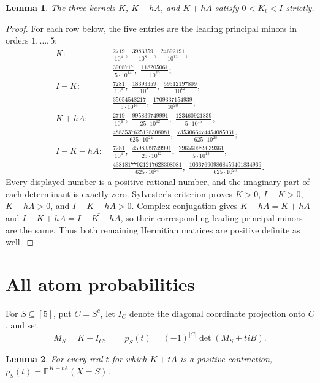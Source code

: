 \documentclass[11pt]{article}
\newtheorem{lemma}{Lemma}
\newcommand{\PP}{\mathbb P}
\begin{document}
\begin{lemma}\label{lem:feasible}
The three kernels $K$, $K-hA$, and $K+hA$ satisfy $0<K_t<I$ strictly.
\end{lemma}

\begin{proof}
For each row below, the five entries are the leading principal minors in orders
$1,\ldots,5$:
\begin{align*}
K:\;&
\frac{2719}{10^4},\;
\frac{3983359}{10^8},\;
\frac{24692191}{10^{12}},\\[-2pt]
&\frac{3908717}{5\cdot10^{14}},\;
\frac{118205061}{10^{20}};\\
I-K:\;&
\frac{7281}{10^4},\;
\frac{18393359}{10^8},\;
\frac{59312197809}{10^{12}},\\[-2pt]
&\frac{35054548217}{5\cdot10^{14}},\;
\frac{1709337154939}{10^{20}};\\
K+hA:\;&
\frac{2719}{10^4},\;
\frac{995839749991}{25\cdot10^{12}},\;
\frac{123460921839}{5\cdot10^{15}},\\[-2pt]
&\frac{4883537625128308081}{625\cdot10^{24}},\;
\frac{7353066474454085031}{625\cdot10^{28}};\\
I-K-hA:\;&
\frac{7281}{10^4},\;
\frac{4598339749991}{25\cdot10^{12}},\;
\frac{296560989039361}{5\cdot10^{15}},\\[-2pt]
&\frac{43818177021217628308081}{625\cdot10^{24}},\;
\frac{106676909868459401834969}{625\cdot10^{28}}.
\end{align*}
Every displayed number is a positive rational number, and the imaginary part of
each determinant is exactly zero.  Sylvester's criterion proves $K>0$, $I-K>0$,
$K+hA>0$, and $I-K-hA>0$.  Complex conjugation gives
$K-hA=\overline{K+hA}$ and $I-K+hA=\overline{I-K-hA}$, so their corresponding
leading principal minors are the same.  Thus both remaining Hermitian matrices
are positive definite as well.
\end{proof}

\section{All atom probabilities}

For $S\subseteq[5]$, put $C=S^c$, let $I_C$ denote the diagonal coordinate
projection onto $C$, and set
\begin{equation}\label{eq:eventdet}
 M_S=K-I_C,
 \qquad
 p_S(t)=(-1)^{|C|}\det(M_S+t iB).
\end{equation}

\begin{lemma}\label{lem:eventformula}
For every real $t$ for which $K+tA$ is a positive contraction,
$p_S(t)=\PP^{K+tA}(X=S)$.
\end{lemma}
\end{document}
